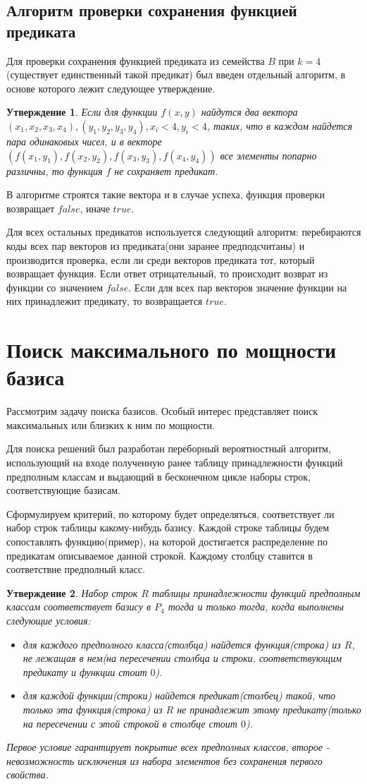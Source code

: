 \documentclass[a4paper,14pt]{extreport}
\newtheorem{utv}{Утверждение}
\begin{document}
\subsection{Алгоритм проверки сохранения функцией предиката}
Для проверки сохранения функцией предиката из семейства $B$ при $k = 4$ (существует единственный такой предикат) был введен отдельный алгоритм, в основе которого лежит следующее утверждение.
\begin{utv}
Если для функции $f(x, y)$ найдутся два вектора $(x_1, x_2, x_3, x_4), (y_1, y_2, y_3, y_4), x_i<4, y_i<4 $, таких, что в каждом найдется пара одинаковых чисел, и в векторе$(f(x_1, y_1),f(x_2, y_2),f(x_3, y_3),f(x_4, y_4))$ все элементы попарно различны, то функция $f$ не сохраняет предикат.  
\end{utv}
В алгоритме строятся такие вектора и в случае успеха, функция проверки возвращает $false$, иначе $true$.

Для всех остальных предикатов используется следующий алгоритм: перебираются коды всех пар векторов из предиката(они заранее предподсчитаны) и производится проверка, если ли среди векторов предиката тот, который возвращает функция. Если ответ отрицательный, то происходит возврат из функции со значением $false$. Если для всех пар векторов значение функции на них принадлежит предикату, то возвращается $true$. 


\newpage
\section{Поиск максимального по мощности базиса}
Рассмотрим задачу поиска базисов. Особый интерес представляет поиск максимальных или близких к ним по мощности. 

Для поиска решений был разработан переборный вероятностный алгоритм, использующий на входе полученную ранее таблицу принадлежности функций предполным классам и выдающий в бесконечном цикле наборы строк, соответствующие базисам. 

Сформулируем критерий, по которому будет определяться, соответствует ли набор строк таблицы какому-нибудь базису.
Каждой строке таблицы будем сопоставлять функцию(пример), на которой достигается распределение по предикатам описываемое данной строкой. Каждому столбцу ставится в соответствие предполный класс.  
\begin{utv}
Набор строк $R$ таблицы принадлежности функций предполным классам соответствует базису в $P_4$ тогда и только тогда, когда выполнены следующие условия:
\begin{itemize}
\item для каждого предполного класса(столбца) найдется функция(строка) из $R$, не лежащая в нем(на пересечении столбца и строки, соответствующим предикату и функции стоит $0$).    
\item для каждой функции(строки) найдется предикат(столбец) такой, что только эта функция(строка) из $R$ не принадлежит этому предикату(только на пересечении с этой строкой в столбце стоит $0$).   
\end{itemize}
Первое условие гарантирует покрытие всех предполных классов, второе - невозможность исключения из набора элементов без сохранения первого свойства. 
\end{utv}
\end{document}
